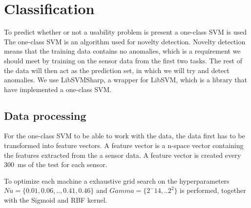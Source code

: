 \section{Classification}
To predict whether or not a usability problem is present a one-class SVM is used
The one-class SVM is an algorithm used for novelty detection. Novelty detection means that the training data contains no anomalies, which is a requirement we should meet by training on the sensor data from the first two tasks.
The rest of the data will then act as the prediction set, in which we will try and detect anomalies.
We use LibSVMSharp\cite{libsvmsharp}, a wrapper for LibSVM\cite{libsvm}, which is a library that have implemented a one-class SVM.

\subsection{Data processing}
For the one-class SVM to be able to work with the data, the data first has to be transformed into feature vectors.
A feature vector is a n-space vector containing the features extracted from the a sensor data.
A feature vector is created every 300~ms of the test for each sensor.


To optimize each machine a exhaustive grid search on the hyperparameters $Nu = \{0.01,0.06,..,0.41, 0.46\}$ and $Gamma = \{2^-14,..2^2\}$ is performed, together with the Sigmoid and RBF kernel. 

